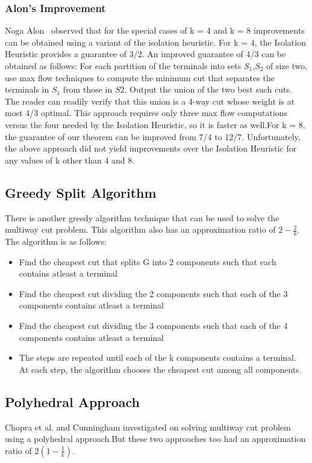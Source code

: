 \documentclass[11pt]{article}
\begin{document}
\subsubsection{Alon's Improvement}
Noga Alon~\cite{Dahlhaus_Alon} observed that for the special cases of k = 4 and k = 8 improvements can be obtained using a variant of the isolation heuristic. For k = 4, the Isolation Heuristic provides a guarantee of 3/2. An improved guarantee of 4/3 can be obtained as follows: For each partition of the terminals into sets $S_1$,$S_2$ of size two, use max flow techniques to
compute the minimum cut that separates the terminals in $S_1$ from those in $S2$. Output the union of the two best such cuts. The reader can readily verify that this union is a 4-way cut whose weight is at most 4/3 optimal. This approach requires only three max flow computations versus the four needed by the Isolation Heuristic, so it is faster as well.For k = 8, the guarantee of our theorem can be improved from 7/4 to 12/7. Unfortunately, the above approach did not yield improvements over the Isolation Heuristic for any values of k other than 4 and 8.

\subsection{Greedy Split Algorithm}
There is another greedy algorithm technique that can be used to solve the multiway cut problem. 
This algorithm also has an approximation ratio of $2 - \frac{2}{k}$. The algorithm is as follows:
\begin{itemize} \itemsep -3pt
\item Find the cheapest cut that splits G into 2 components such that each contains atleast a  terminal
\item Find the cheapest cut dividing the 2 components such that each of the 3 components contains atleast a  terminal
\item Find the cheapest cut dividing the 3 components such that each of the 4 components contains atleast a terminal
\item The steps are repeated until each of the k components contains a terminal. At each step, the algorithm chooses the cheapest cut among all components.
\end{itemize}

\subsection{Polyhedral Approach}
Chopra et al.\cite{chopra_1,chopra_2} and Cunningham\cite{cunningham} investigated on solving multiway cut problem using a polyhedral approach.But these two approaches too had an approximation ratio of $2(1 - \frac{1}{k})$.
\end{document}
